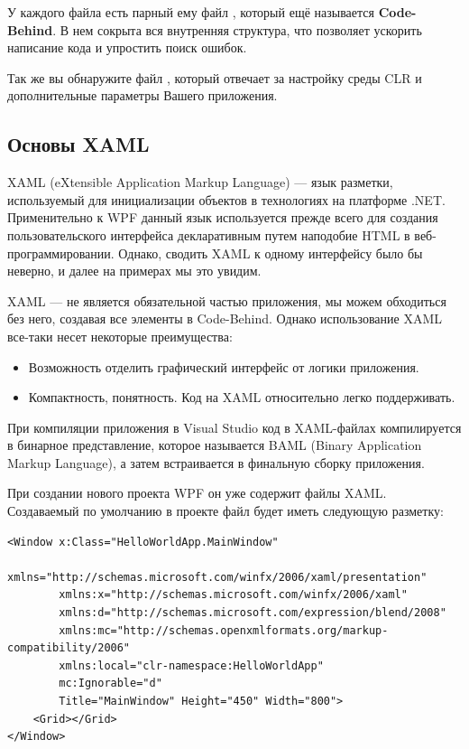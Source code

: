 У каждого файла  есть парный ему файл , который ещё называется \textbf{Code-Behind}. В нем сокрыта вся внутренняя структура, что позволяет ускорить написание кода и упростить поиск ошибок.

Так же вы обнаружите файл , который отвечает за настройку среды CLR и дополнительные параметры Вашего приложения.

\subsection{Основы XAML} \label{XAML_basics}
XAML (eXtensible Application Markup Language) — язык разметки, используемый для инициализации объектов в технологиях на платформе .NET. Применительно к WPF данный язык используется прежде всего для создания пользовательского интерфейса декларативным путем наподобие HTML в веб-программировании. Однако, сводить XAML к одному интерфейсу было бы неверно, и далее на примерах мы это увидим.

XAML — не является обязательной частью приложения, мы можем обходиться без него, создавая все элементы в Code-Behind. Однако использование XAML все-таки несет некоторые преимущества:

\begin{itemize}
\item Возможность отделить графический интерфейс от логики приложения.
\item Компактность, понятность. Код на XAML относительно легко поддерживать.
\end{itemize}

При компиляции приложения в Visual Studio код в XAML-файлах компилируется в бинарное представление, которое называется BAML (Binary Application Markup Language), а затем встраивается в финальную сборку приложения.

При создании нового проекта WPF он уже содержит файлы XAML. Создаваемый по умолчанию в проекте файл  будет иметь следующую разметку:

\begin{verbatim}
<Window x:Class="HelloWorldApp.MainWindow"
        xmlns="http://schemas.microsoft.com/winfx/2006/xaml/presentation"
        xmlns:x="http://schemas.microsoft.com/winfx/2006/xaml"
        xmlns:d="http://schemas.microsoft.com/expression/blend/2008"
        xmlns:mc="http://schemas.openxmlformats.org/markup-compatibility/2006"
        xmlns:local="clr-namespace:HelloWorldApp"
        mc:Ignorable="d"
        Title="MainWindow" Height="450" Width="800">
    <Grid></Grid>
</Window>
\end{verbatim}

